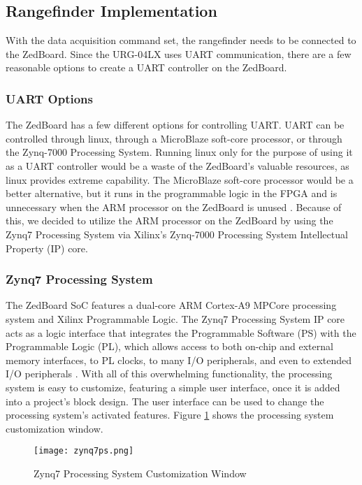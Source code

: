\subsection{Rangefinder Implementation}
With the data acquisition command set, the rangefinder needs to be connected to the ZedBoard. Since the URG-04LX uses UART communication, there are a few reasonable options to create a UART controller on the ZedBoard.

\subsubsection{UART Options}
The ZedBoard has a few different options for controlling UART. UART can be controlled through linux, through a MicroBlaze soft-core processor, or through the Zynq-7000 Processing System. Running linux only for the purpose of using it as a UART controller would be a waste of the ZedBoard's valuable resources, as linux provides extreme capability. The MicroBlaze soft-core processor would be a better alternative, but it runs in the programmable logic in the FPGA and is unnecessary when the ARM processor on the ZedBoard is unused \cite{microblaze}. Because of this, we decided to utilize the ARM processor on the ZedBoard by using the Zynq7 Processing System via Xilinx's Zynq-7000 Processing System Intellectual Property (IP) core.

\subsubsection{Zynq7 Processing System}
\label{zynq7processingsystem}
The ZedBoard SoC features a dual-core ARM Cortex-A9 MPCore processing system and Xilinx Programmable Logic. The Zynq7 Processing System IP core acts as a logic interface that integrates the Programmable Software (PS) with the Programmable Logic (PL), which allows access to both on-chip and external memory interfaces, to PL clocks, to many I/O peripherals, and even to extended I/O peripherals \cite{zynq7ps}. With all of this overwhelming functionality, the processing system is easy to customize, featuring a simple user interface, once it is added into a project's block design. The user interface can be used to change the processing system's activated features. Figure \ref{zynq7ps_pic} shows the processing system customization window.

\begin{figure}[H]
	\centerline{\texttt{[image: zynq7ps.png]}}
	\caption{Zynq7 Processing System Customization Window \cite{zynq7ps}}
	\label{zynq7ps_pic}
\end{figure}

